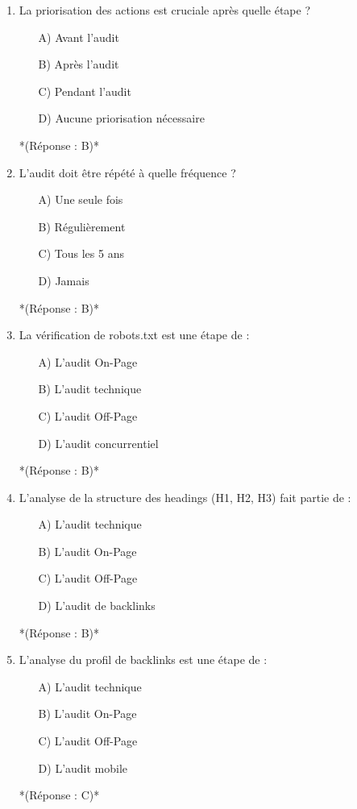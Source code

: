 \documentclass[12pt,a4paper,twoside]{report}
\begin{document}
\begin{enumerate}
    \item La priorisation des actions est cruciale après quelle étape ?
    \begin{itemize}
        \item[A)] Avant l'audit
        \item[B)] Après l'audit
        \item[C)] Pendant l'audit
        \item[D)] Aucune priorisation nécessaire
    \end{itemize}
    *(Réponse : B)*

    \item L'audit doit être répété à quelle fréquence ?
    \begin{itemize}
        \item[A)] Une seule fois
        \item[B)] Régulièrement
        \item[C)] Tous les 5 ans
        \item[D)] Jamais
    \end{itemize}
    *(Réponse : B)*

    \item La vérification de robots.txt est une étape de :
    \begin{itemize}
        \item[A)] L'audit On-Page
        \item[B)] L'audit technique
        \item[C)] L'audit Off-Page
        \item[D)] L'audit concurrentiel
    \end{itemize}
    *(Réponse : B)*

    \item L'analyse de la structure des headings (H1, H2, H3) fait partie de :
    \begin{itemize}
        \item[A)] L'audit technique
        \item[B)] L'audit On-Page
        \item[C)] L'audit Off-Page
        \item[D)] L'audit de backlinks
    \end{itemize}
    *(Réponse : B)*

    \item L'analyse du profil de backlinks est une étape de :
    \begin{itemize}
        \item[A)] L'audit technique
        \item[B)] L'audit On-Page
        \item[C)] L'audit Off-Page
        \item[D)] L'audit mobile
    \end{itemize}
    *(Réponse : C)*


\end{enumerate}
\end{document}
